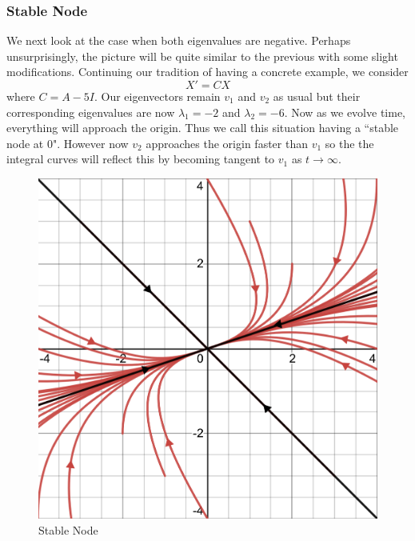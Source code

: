 \subsubsection{Stable Node}
We next look at the case when both eigenvalues are negative. Perhaps unsurprisingly, the picture will be quite similar to the previous with some slight modifications. Continuing our tradition of having a concrete example, we consider
\begin{equation}
    X' = CX
\end{equation}
where $C = A - 5 I$. Our eigenvectors remain $v_1$ and $v_2$ as usual but their corresponding eigenvalues are now $\lambda_1 = -2$ and $\lambda_2 = -6$. Now as we evolve time, everything will approach the origin. Thus we call this situation having a ``stable node at 0". However now $v_2$ approaches the origin faster than $v_1$ so the the integral curves will reflect this by becoming tangent to $v_1$ as $t \to \infty$.
\begin{figure}[h]
    \centering
    \includegraphics[scale=0.25]{Images/stable_node.png}
    \caption{Stable Node}
    \label{fig:stable_node}
\end{figure}

